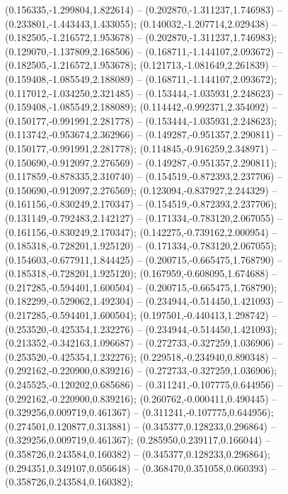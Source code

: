  (0.156335,-1.299804,1.822614) -- (0.202870,-1.311237,1.746983) -- (0.233801,-1.443443,1.433055);
 (0.140032,-1.207714,2.029438) -- (0.182505,-1.216572,1.953678) -- (0.202870,-1.311237,1.746983);
 (0.129070,-1.137809,2.168506) -- (0.168711,-1.144107,2.093672) -- (0.182505,-1.216572,1.953678);
 (0.121713,-1.081649,2.261839) -- (0.159408,-1.085549,2.188089) -- (0.168711,-1.144107,2.093672);
 (0.117012,-1.034250,2.321485) -- (0.153444,-1.035931,2.248623) -- (0.159408,-1.085549,2.188089);
 (0.114442,-0.992371,2.354092) -- (0.150177,-0.991991,2.281778) -- (0.153444,-1.035931,2.248623);
 (0.113742,-0.953674,2.362966) -- (0.149287,-0.951357,2.290811) -- (0.150177,-0.991991,2.281778);
 (0.114845,-0.916259,2.348971) -- (0.150690,-0.912097,2.276569) -- (0.149287,-0.951357,2.290811);
 (0.117859,-0.878335,2.310740) -- (0.154519,-0.872393,2.237706) -- (0.150690,-0.912097,2.276569);
 (0.123094,-0.837927,2.244329) -- (0.161156,-0.830249,2.170347) -- (0.154519,-0.872393,2.237706);
 (0.131149,-0.792483,2.142127) -- (0.171334,-0.783120,2.067055) -- (0.161156,-0.830249,2.170347);
 (0.142275,-0.739162,2.000954) -- (0.185318,-0.728201,1.925120) -- (0.171334,-0.783120,2.067055);
 (0.154603,-0.677911,1.844425) -- (0.200715,-0.665475,1.768790) -- (0.185318,-0.728201,1.925120);
 (0.167959,-0.608095,1.674688) -- (0.217285,-0.594401,1.600504) -- (0.200715,-0.665475,1.768790);
 (0.182299,-0.529062,1.492304) -- (0.234944,-0.514450,1.421093) -- (0.217285,-0.594401,1.600504);
 (0.197501,-0.440413,1.298742) -- (0.253520,-0.425354,1.232276) -- (0.234944,-0.514450,1.421093);
 (0.213352,-0.342163,1.096687) -- (0.272733,-0.327259,1.036906) -- (0.253520,-0.425354,1.232276);
 (0.229518,-0.234940,0.890348) -- (0.292162,-0.220900,0.839216) -- (0.272733,-0.327259,1.036906);
 (0.245525,-0.120202,0.685686) -- (0.311241,-0.107775,0.644956) -- (0.292162,-0.220900,0.839216);
 (0.260762,-0.000411,0.490445) -- (0.329256,0.009719,0.461367) -- (0.311241,-0.107775,0.644956);
 (0.274501,0.120877,0.313881) -- (0.345377,0.128233,0.296864) -- (0.329256,0.009719,0.461367);
 (0.285950,0.239117,0.166044) -- (0.358726,0.243584,0.160382) -- (0.345377,0.128233,0.296864);
 (0.294351,0.349107,0.056648) -- (0.368470,0.351058,0.060393) -- (0.358726,0.243584,0.160382);
